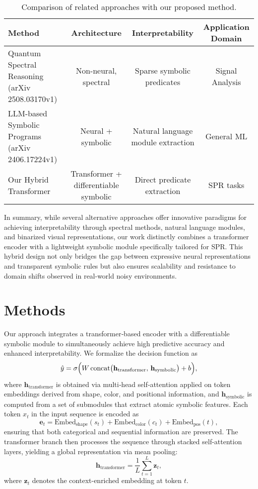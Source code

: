 \documentclass{article}
\begin{document}
\begin{table}[h]
\centering
\begin{tabular}{lccc}
\hline
Method & Architecture & Interpretability & Application Domain \\
\hline
Quantum Spectral Reasoning (arXiv 2508.03170v1) & Non-neural, spectral & Sparse symbolic predicates & Signal Analysis \\
LLM-based Symbolic Programs (arXiv 2406.17224v1) & Neural + symbolic & Natural language module extraction & General ML \\
Our Hybrid Transformer & Transformer + differentiable symbolic & Direct predicate extraction & SPR tasks \\
\hline
\end{tabular}
\caption{Comparison of related approaches with our proposed method.}
\label{tab:comparison}
\end{table}

In summary, while several alternative approaches offer innovative paradigms for achieving interpretability through spectral methods, natural language modules, and binarized visual representations, our work distinctly combines a transformer encoder with a lightweight symbolic module specifically tailored for SPR. This hybrid design not only bridges the gap between expressive neural representations and transparent symbolic rules but also ensures scalability and resistance to domain shifts observed in real-world noisy environments.

\section{Methods}
Our approach integrates a transformer‐based encoder with a differentiable symbolic module to simultaneously achieve high predictive accuracy and enhanced interpretability. We formalize the decision function as 
\[
\hat{y} = \sigma\Bigl(W\,\mathrm{concat}\bigl(\mathbf{h}_{\text{transformer}},\, \mathbf{h}_{\text{symbolic}}\bigr) + b\Bigr),
\]
where \(\mathbf{h}_{\text{transformer}}\) is obtained via multi‐head self‐attention applied on token embeddings derived from shape, color, and positional information, and \(\mathbf{h}_{\text{symbolic}}\) is computed from a set of submodules that extract atomic symbolic features. Each token \(x_t\) in the input sequence is encoded as 
\[
\mathbf{e}_t = \text{Embed}_{\text{shape}}(s_t) + \text{Embed}_{\text{color}}(c_t) + \text{Embed}_{\text{pos}}(t),
\]
ensuring that both categorical and sequential information are preserved. The transformer branch then processes the sequence through stacked self-attention layers, yielding a global representation via mean pooling:
\[
\mathbf{h}_{\text{transformer}} = \frac{1}{L}\sum_{t=1}^{L}\mathbf{z}_t,
\]
where \(\mathbf{z}_t\) denotes the context-enriched embedding at token \(t\).
\end{document}
